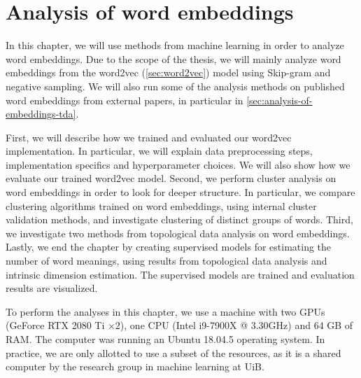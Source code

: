 \chapter{Analysis of word embeddings}
In this chapter, we will use methods from machine learning in order to analyze word embeddings. Due to the scope of the thesis, we will mainly analyze word embeddings from the word2vec (\cref{sec:word2vec}) model using Skip-gram and negative sampling. We will also run some of the analysis methods on published word embeddings from external papers, in particular in \cref{sec:analysis-of-embeddings-tda}.

First, we will describe how we trained and evaluated our word2vec implementation. In particular, we will explain data preprocessing steps, implementation specifics and hyperparameter choices. We will also show how we evaluate our trained word2vec model. Second, we perform cluster analysis on word embeddings in order to look for deeper structure. In particular, we compare clustering algorithms trained on word embeddings, using internal cluster validation methods, and investigate clustering of distinct groups of words. Third, we investigate two methods from topological data analysis on word embeddings. Lastly, we end the chapter by creating supervised models for estimating the number of word meanings, using results from topological data analysis and intrinsic dimension estimation. The supervised models are trained and evaluation results are visualized.

To perform the analyses in this chapter, we use a machine with two GPUs (GeForce RTX 2080 Ti $\times2$), one CPU (Intel i9-7900X @ 3.30GHz) and 64 GB of RAM. The computer was running an Ubuntu 18.04.5 operating system. In practice, we are only allotted to use a subset of the resources, as it is a shared computer by the research group in machine learning at UiB.



